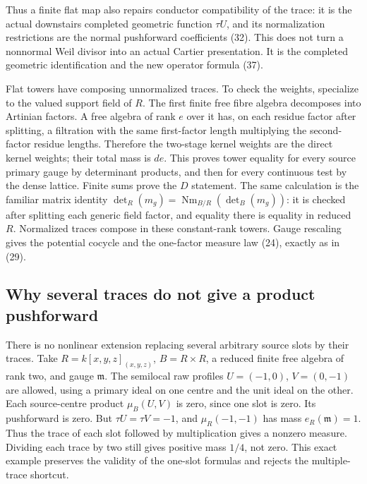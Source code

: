 Thus a finite flat map also repairs conductor compatibility
of the trace: it is the actual downstairs completed geometric
function \(\tau U\), and its normalization restrictions are
the normal pushforward coefficients (32). This does not turn
a nonnormal Weil divisor into an actual Cartier presentation.
It is the completed geometric identification and the new
operator formula (37).

Flat towers have composing unnormalized traces. To check
the weights, specialize to the valued support field of \(R\).
The first finite free fibre algebra decomposes into
Artinian factors. A free algebra of rank \(e\) over it
has, on each residue factor after splitting, a filtration
with the same first-factor length multiplying the
second-factor residue lengths. Therefore the two-stage
kernel weights are the direct kernel weights; their
total mass is \(de\). This proves tower equality for
every source primary gauge by determinant products, and
then for every continuous test by the dense lattice.
Finite sums prove the \(D\) statement. The same calculation
is the familiar matrix identity
\(\det_R(m_g)=\operatorname{Nm}_{B/R}(\det_B(m_g))\):
it is checked after splitting each generic field factor,
and equality there is equality in reduced \(R\).
Normalized traces compose in these constant-rank towers.
Gauge rescaling gives the potential cocycle and the
one-factor measure law (24), exactly as in (29).

\subsection*{Why several traces do not give a product pushforward}
There is no nonlinear extension replacing several arbitrary
source slots by their traces. Take
\(R=k[x,y,z]_{(x,y,z)}\), \(B=R\times R\), a reduced finite
free algebra of rank two, and gauge \(\mathfrak m\).
The semilocal raw profiles \(U=(-1,0)\), \(V=(0,-1)\)
are allowed, using a primary ideal on one centre and the
unit ideal on the other. Each source-centre product
\(\mu_B(U,V)\) is zero, since one slot is zero. Its
pushforward is zero. But \(\tau U=\tau V=-1\), and
\(\mu_R(-1,-1)\) has mass \(e_R(\mathfrak m)=1\).
Thus the trace of each slot followed by multiplication
gives a nonzero measure. Dividing each trace by two
still gives positive mass \(1/4\), not zero.
This exact example preserves the validity of the
one-slot formulas and rejects the multiple-trace shortcut.

